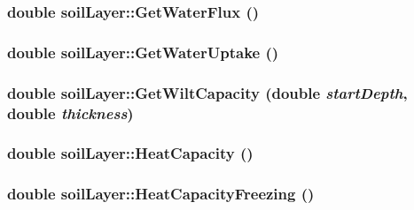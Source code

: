 \label{classsoil_layer_ac492720707c5061523bb4996b522107f}
\hypertarget{classsoil_layer_a41a31736ecff9877a3fbc566eb11e1ad}{
\subsubsection[{GetWaterFlux}]{\setlength{\rightskip}{0pt plus 5cm}double soilLayer::GetWaterFlux ()}}
\label{classsoil_layer_a41a31736ecff9877a3fbc566eb11e1ad}
\hypertarget{classsoil_layer_aa4742cb804f4a91222d0f7a6c6fe6e70}{
\subsubsection[{GetWaterUptake}]{\setlength{\rightskip}{0pt plus 5cm}double soilLayer::GetWaterUptake ()}}
\label{classsoil_layer_aa4742cb804f4a91222d0f7a6c6fe6e70}
\hypertarget{classsoil_layer_a722893625125bc8ab7be416118ed908e}{
\subsubsection[{GetWiltCapacity}]{\setlength{\rightskip}{0pt plus 5cm}double soilLayer::GetWiltCapacity (double {\em startDepth}, \/  double {\em thickness})}}
\label{classsoil_layer_a722893625125bc8ab7be416118ed908e}
\hypertarget{classsoil_layer_a0f90f88d0dfdd44b5075f2e20cec6f45}{
\subsubsection[{HeatCapacity}]{\setlength{\rightskip}{0pt plus 5cm}double soilLayer::HeatCapacity ()}}
\label{classsoil_layer_a0f90f88d0dfdd44b5075f2e20cec6f45}
\hypertarget{classsoil_layer_aea32d315c53d868d637078ca9a3c5cd9}{
\subsubsection[{HeatCapacityFreezing}]{\setlength{\rightskip}{0pt plus 5cm}double soilLayer::HeatCapacityFreezing ()}}
